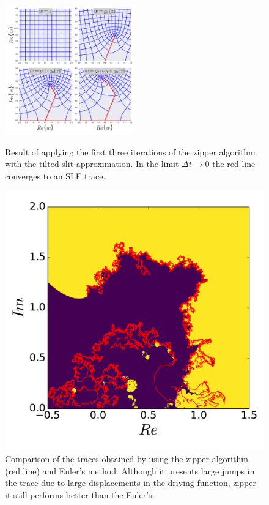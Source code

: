 \begin{figure}
\begin{center}
    \includegraphics[width=0.5\textwidth]{chapters/ch4-sle/figs/zipper}
\end{center}
\caption{Result of applying the first three iterations of the zipper algorithm
    with the tilted slit approximation. In the limit $\Delta t\rightarrow 0$
    the red line converges to an SLE trace.}
\label{fig:zipper}
\begin{center}
    \includegraphics[scale=0.5]{chapters/ch4-sle/figs/eulerzip}
\end{center}
\caption{Comparison of the traces obtained by using the zipper algorithm (red
    line) and Euler's method. Although it presents large jumps in the trace due
    to large displacements in the driving function, zipper it still performs
    better than the Euler's.}
\label{fig:eulerzip}
\end{figure}
